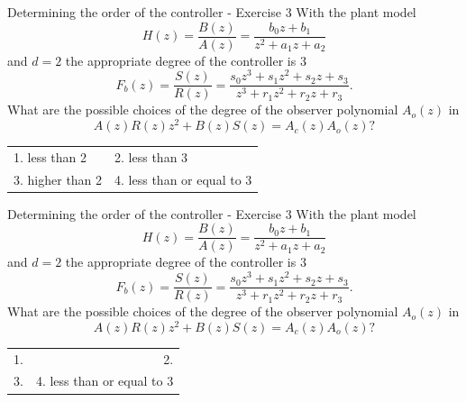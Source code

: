 \documentclass[presentation,aspectratio=169]{beamer}
\begin{document}
\begin{frame}[label=sec-3-7]{Determining the order of the controller - Exercise 3}
With the plant model \[H(z) = \frac{B(z)}{A(z)} = \frac{b_0z + b_1}{z^2 + a_1z + a_2}\] and \(d=2\)    the appropriate degree of the controller is 3 
\[F_b(z) = \frac{S(z)}{R(z)} = \frac{s_0z^3 + s_1z^2 + s_2z + s_3}{z^3 + r_1 z^2 + r_2z + r_3}.\]
What are the possible choices of the degree of the observer polynomial \(A_o(z)\) in
\[ A(z)R(z)z^2 + B(z)S(z) = A_c(z)A_o(z)?\]
\begin{center}
\begin{tabular}{ll}
1. less than 2 & 2. less than 3\\
3. higher than 2 & 4. less than or equal to 3\\
\end{tabular}
\end{center}
\end{frame}

\begin{frame}[label=sec-3-8]{Determining the order of the controller - Exercise 3}
With the plant model \[H(z) = \frac{B(z)}{A(z)} = \frac{b_0z + b_1}{z^2 + a_1z + a_2}\] and \(d=2\)    the appropriate degree of the controller is 3
\[F_b(z) = \frac{S(z)}{R(z)} = \frac{s_0z^3 + s_1z^2 + s_2z + s_3}{z^3 + r_1 z^2 + r_2z + r_3}.\]
What are the possible choices of the degree of the observer polynomial \(A_o(z)\) in
\[ A(z)R(z)z^2 + B(z)S(z) = A_c(z)A_o(z)?\]
\begin{center}
\begin{tabular}{rr}
1. & 2.\\
3. & 4. less than or equal to 3\\
\end{tabular}
\end{center}
\end{frame}
\end{document}
